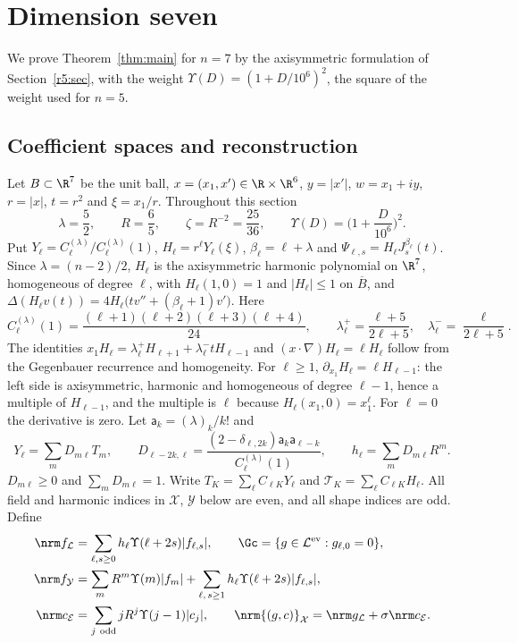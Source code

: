 \section{Dimension seven}\label{r7:sec}

We prove Theorem~\ref{thm:main} for $n=7$ by the axisymmetric formulation of Section~\ref{r5:sec}, with the weight $\Upsilon(D)=(1+D/10^6)^2$, the square of the weight used for $n=5$.

\subsection{Coefficient spaces and reconstruction}\label{r7:sec-spaces}
Let $B\subset\R^7$ be the unit ball, $x=(x_1,x')\in\R\times\R^6$, $y=|x'|$, $w=x_1+iy$, $r=|x|$, $t=r^2$ and $\xi=x_1/r$. Throughout this section
\[
\lambda=\frac52,\qquad R=\frac65,\qquad\zeta=R^{-2}=\frac{25}{36},\qquad
\Upsilon(D)=\Big(1+\frac D{10^6}\Big)^2.
\]
Put $Y_\ell=C^{(\lambda)}_\ell/C^{(\lambda)}_\ell(1)$, $H_\ell=r^\ell Y_\ell(\xi)$, $\beta_\ell=\ell+\lambda$ and $\Psi_{\ell,s}=H_\ell J^{\beta_\ell}_s(t)$. Since $\lambda=(n-2)/2$, $H_\ell$ is the axisymmetric harmonic polynomial on $\R^7$, homogeneous of degree $\ell$, with $H_\ell(1,0)=1$ and $|H_\ell|\leq1$ on $\overline B$, and $\Delta(H_\ell v(t))=4H_\ell\big(tv''+(\beta_\ell+1)v'\big)$. Here
\[
C^{(\lambda)}_\ell(1)=\frac{(\ell+1)(\ell+2)(\ell+3)(\ell+4)}{24},\qquad
\lambda^+_\ell=\frac{\ell+5}{2\ell+5},\quad\lambda^-_\ell=\frac\ell{2\ell+5}.
\]
The identities $x_1H_\ell=\lambda^+_\ell H_{\ell+1}+\lambda^-_\ell tH_{\ell-1}$ and $(x\cdot\nabla)H_\ell=\ell H_\ell$ follow from the Gegenbauer recurrence and homogeneity. For $\ell\geq1$, $\partial_{x_1}H_\ell=\ell H_{\ell-1}$: the left side is axisymmetric, harmonic and homogeneous of degree $\ell-1$, hence a multiple of $H_{\ell-1}$, and the multiple is $\ell$ because $H_\ell(x_1,0)=x_1^\ell$. For $\ell=0$ the derivative is zero. Let $\mathsf a_k=(\lambda)_k/k!$ and
\[
Y_\ell=\sum_mD_{m\ell}T_m,\qquad
D_{\ell-2k,\ell}=\frac{(2-\delta_{\ell,2k})\mathsf a_k\mathsf a_{\ell-k}}{C^{(\lambda)}_\ell(1)},\qquad h_\ell=\sum_mD_{m\ell}R^m.
\]
$D_{m\ell}\geq0$ and $\sum_mD_{m\ell}=1$. Write $T_K=\sum_\ell C_{\ell K}Y_\ell$ and $\mathcal T_K=\sum_\ell C_{\ell K}H_\ell$. All field and harmonic indices in $\mathcal X$, $\mathcal Y$ below are even, and all shape indices are odd. Define
\begin{align*}
\nrm f_{\mathcal L}&=\sum_{\ell,s\geq0}h_\ell\Upsilon(\ell+2s)|f_{\ell,s}|,\qquad
\Gc=\{g\in\mathcal L^{\mathrm{ev}}:g_{\ell,0}=0\},\\
\nrm f_{\mathcal Y}&=\sum_mR^m\Upsilon(m)|f_m|+\sum_{\ell,\,s\geq1}h_\ell\Upsilon(\ell+2s)|f_{\ell,s}|,\\
\nrm c_{\mathcal E}&=\sum_{j\ \mathrm{odd}}jR^j\Upsilon(j-1)|c_j|,\qquad
\nrm{(g,c)}_{\mathcal X}=\nrm g_{\mathcal L}+\sigma\nrm c_{\mathcal E}.
\end{align*}
